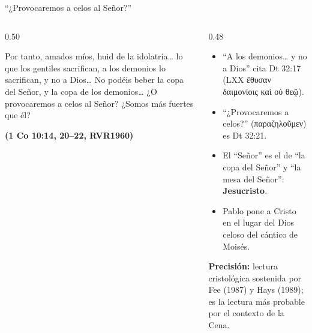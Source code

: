 \documentclass[hyperref={bookmarks=false},aspectratio=169]{beamer}
\newcommand{\grc}[1]{\foreignlanguage{ancientgreek}{#1}}
\newcommand{\fuente}[1]{\par\hfill{\upshape\bfseries\footnotesize\textcolor{azul}{#1}}}
\newcommand{\destacar}[1]{\textbf{\textcolor{azul}{#1}}}
\newcommand{\precision}[1]{{\footnotesize\color{gris}\textbf{Precisión:} #1}}
\begin{document}
\begin{frame}{``¿Provocaremos a celos al Señor?''}
\begin{columns}[t,onlytextwidth]
\begin{column}{0.50\textwidth}
\begin{cita}Por tanto, amados míos, huid de la idolatría\ldots{} lo que los gentiles sacrifican, a los demonios lo sacrifican, y no a Dios\ldots{} No podéis beber la copa del Señor, y la copa de los demonios\ldots{} ¿O provocaremos a celos al Señor? ¿Somos más fuertes que él?\fuente{(1 Co 10:14, 20--22, RVR1960)}\end{cita}
\end{column}
\begin{column}{0.48\textwidth}\small
\begin{itemize}
\item ``A los demonios\ldots{} y no a Dios'' cita Dt 32:17 (LXX \grc{ἔθυσαν δαιμονίοις καὶ οὐ θεῷ}).
\item ``¿Provocaremos a celos?'' (\grc{παραζηλοῦμεν}) es Dt 32:21.
\item El ``Señor'' es el de ``la copa del Señor'' y ``la mesa del Señor'': \destacar{Jesucristo}.
\item Pablo pone a Cristo en el lugar del Dios celoso del cántico de Moisés.
\end{itemize}
\precision{lectura cristológica sostenida por Fee (1987) y Hays (1989); es la lectura más probable por el contexto de la Cena.}
\end{column}
\end{columns}
\end{frame}
\end{document}
